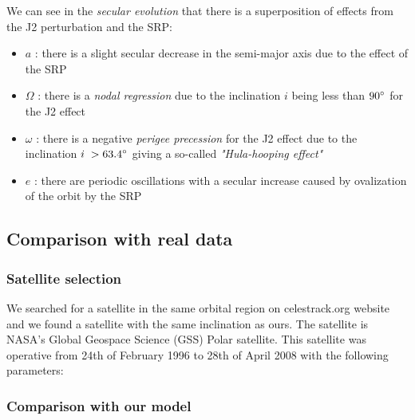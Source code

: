 \documentclass[11pt,a4paper]{report}
\begin{document}
\par We can see in the \emph{secular evolution} that there is a superposition of effects from the J2 perturbation and the SRP:
\begin{itemize}
    \item \emph{$a$} : there is a slight secular decrease in the semi-major axis due to the effect of the SRP 
    \item \emph{$\Omega$} : there is a \emph{nodal regression} due to the inclination $i$ being less than $90\degree$ for the J2 effect
    \item  \emph{$\omega$} : there is a negative \emph{perigee precession} for the J2 effect due to the inclination $i\;> 63.4\degree$ giving a so-called \emph{"Hula-hooping effect"}
    \item \emph{$e$} : there are periodic oscillations with a secular increase caused by ovalization of the orbit by the SRP
\end{itemize}

\subsection{Comparison with real data}

\subsubsection{Satellite selection}
We searched for a satellite in the same orbital region on celestrack.org website and we found a satellite with the same inclination as ours. 
The satellite is NASA’s Global Geospace Science (GSS) Polar satellite.
This satellite was operative from 24th of February 1996 to 28th of April 2008 with the following parameters:


\begin{table}[H]
\centering
{}
\end{table}
\subsubsection{Comparison with our model}
\end{document}
